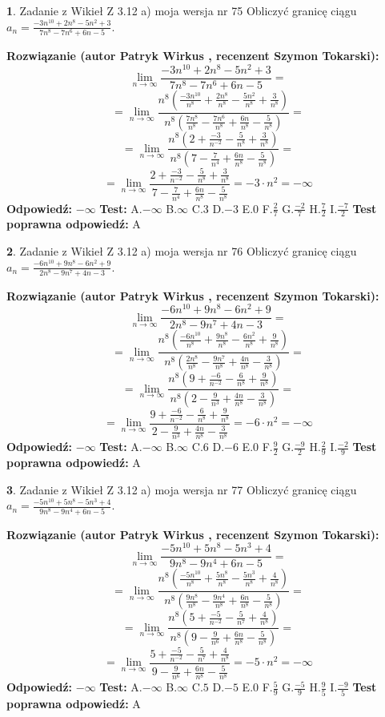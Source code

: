 \documentclass[12pt, a4paper]{article}
\theoremstyle{definition} %
\newtheorem{zad}{}
\newcommand{\zadStart}[1]{\begin{zad}#1\newline}
\newcommand{\zadStop}{\end{zad}}
\newcommand{\rozwStart}[2]{\noindent \textbf{Rozwiązanie (autor #1 , recenzent #2): }\newline}
\newcommand{\rozwStop}{\newline}
\newcommand{\odpStart}{\noindent \textbf{Odpowiedź:}\newline}
\newcommand{\odpStop}{\newline}
\newcommand{\testStart}{\noindent \textbf{Test:}\newline}
\newcommand{\testStop}{\newline}
\newcommand{\kluczStart}{\noindent \textbf{Test poprawna odpowiedź:}\newline}
\newcommand{\kluczStop}{\newline}
\begin{document}
\zadStart{Zadanie z Wikieł Z 3.12 a) moja wersja nr 75}
Obliczyć granicę ciągu $a_{n}=\frac{-3n^{10}+2n^{8}-5n^{2}+3}{7n^{8}-7n^{6}+6n-5}$.
\zadStop
\rozwStart{Patryk Wirkus}{Szymon Tokarski}
$$\lim\limits_{n\to\infty}\frac{-3n^{10}+2n^{8}-5n^{2}+3}{7n^{8}-7n^{6}+6n-5}=$$
$$=\lim\limits_{n\to\infty}\frac{n^{8}\left(\frac{-3n^{10}}{n^{8}}+\frac{2n^{8}}{n^{8}}-\frac{5n^{2}}{n^{8}}+\frac{3}{n^{8}}\right)}{n^{8}\left(\frac{7n^{8}}{n^{8}}-\frac{7n^{6}}{n^{8}}+\frac{6n}{n^{8}}-\frac{5}{n^{8}}\right)}=$$
$$=\lim\limits_{n\to\infty}\frac{n^{8}\left(2+\frac{-3}{n^{-2}}-\frac{5}{n^{8}}+\frac{3}{n^{8}}\right)}
{n^{8}\left(7-\frac{7}{n^{4}}+\frac{6n}{n^{8}}-\frac{5}{n^{8}}\right)}=$$
$$=\lim\limits_{n\to\infty}\frac{2+\frac{-3}{n^{-2}}-\frac{5}{n^{8}}+\frac{3}{n^{8}}}{7-\frac{7}{n^{4}}+\frac{6n}{n^{8}}-\frac{5}{n^{8}}}=-3\cdot n^{2} = -\infty$$
\rozwStop
\odpStart
$-\infty$
\odpStop
\testStart
A.$-\infty$
B.$\infty$
C.$3$
D.$-3$
E.$0$
F.$\frac{2}{7}$
G.$\frac{-2}{7}$
H.$\frac{7}{2}$
I.$\frac{-7}{2}$
\testStop
\kluczStart
A
\kluczStop



\zadStart{Zadanie z Wikieł Z 3.12 a) moja wersja nr 76}
Obliczyć granicę ciągu $a_{n}=\frac{-6n^{10}+9n^{8}-6n^{2}+9}{2n^{8}-9n^{7}+4n-3}$.
\zadStop
\rozwStart{Patryk Wirkus}{Szymon Tokarski}
$$\lim\limits_{n\to\infty}\frac{-6n^{10}+9n^{8}-6n^{2}+9}{2n^{8}-9n^{7}+4n-3}=$$
$$=\lim\limits_{n\to\infty}\frac{n^{8}\left(\frac{-6n^{10}}{n^{8}}+\frac{9n^{8}}{n^{8}}-\frac{6n^{2}}{n^{8}}+\frac{9}{n^{8}}\right)}{n^{8}\left(\frac{2n^{8}}{n^{8}}-\frac{9n^{7}}{n^{8}}+\frac{4n}{n^{8}}-\frac{3}{n^{8}}\right)}=$$
$$=\lim\limits_{n\to\infty}\frac{n^{8}\left(9+\frac{-6}{n^{-2}}-\frac{6}{n^{8}}+\frac{9}{n^{8}}\right)}
{n^{8}\left(2-\frac{9}{n^{3}}+\frac{4n}{n^{8}}-\frac{3}{n^{8}}\right)}=$$
$$=\lim\limits_{n\to\infty}\frac{9+\frac{-6}{n^{-2}}-\frac{6}{n^{8}}+\frac{9}{n^{8}}}{2-\frac{9}{n^{3}}+\frac{4n}{n^{8}}-\frac{3}{n^{8}}}=-6\cdot n^{2} = -\infty$$
\rozwStop
\odpStart
$-\infty$
\odpStop
\testStart
A.$-\infty$
B.$\infty$
C.$6$
D.$-6$
E.$0$
F.$\frac{9}{2}$
G.$\frac{-9}{2}$
H.$\frac{2}{9}$
I.$\frac{-2}{9}$
\testStop
\kluczStart
A
\kluczStop



\zadStart{Zadanie z Wikieł Z 3.12 a) moja wersja nr 77}
Obliczyć granicę ciągu $a_{n}=\frac{-5n^{10}+5n^{8}-5n^{3}+4}{9n^{8}-9n^{4}+6n-5}$.
\zadStop
\rozwStart{Patryk Wirkus}{Szymon Tokarski}
$$\lim\limits_{n\to\infty}\frac{-5n^{10}+5n^{8}-5n^{3}+4}{9n^{8}-9n^{4}+6n-5}=$$
$$=\lim\limits_{n\to\infty}\frac{n^{8}\left(\frac{-5n^{10}}{n^{8}}+\frac{5n^{8}}{n^{8}}-\frac{5n^{3}}{n^{8}}+\frac{4}{n^{8}}\right)}{n^{8}\left(\frac{9n^{8}}{n^{8}}-\frac{9n^{4}}{n^{8}}+\frac{6n}{n^{8}}-\frac{5}{n^{8}}\right)}=$$
$$=\lim\limits_{n\to\infty}\frac{n^{8}\left(5+\frac{-5}{n^{-2}}-\frac{5}{n^{7}}+\frac{4}{n^{8}}\right)}
{n^{8}\left(9-\frac{9}{n^{6}}+\frac{6n}{n^{8}}-\frac{5}{n^{8}}\right)}=$$
$$=\lim\limits_{n\to\infty}\frac{5+\frac{-5}{n^{-2}}-\frac{5}{n^{7}}+\frac{4}{n^{8}}}{9-\frac{9}{n^{6}}+\frac{6n}{n^{8}}-\frac{5}{n^{8}}}=-5\cdot n^{2} = -\infty$$
\rozwStop
\odpStart
$-\infty$
\odpStop
\testStart
A.$-\infty$
B.$\infty$
C.$5$
D.$-5$
E.$0$
F.$\frac{5}{9}$
G.$\frac{-5}{9}$
H.$\frac{9}{5}$
I.$\frac{-9}{5}$
\testStop
\kluczStart
A
\kluczStop
\end{document}
